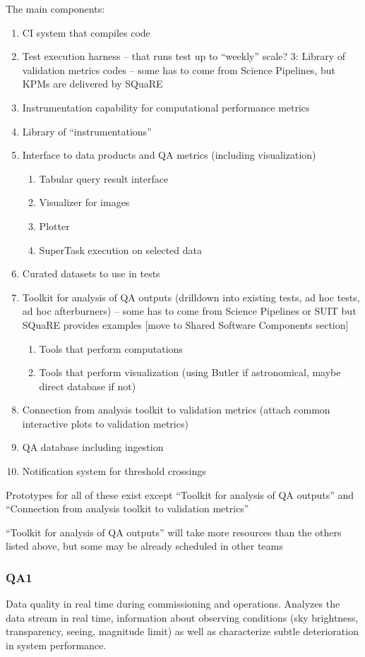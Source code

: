 The main components:
\begin{enumerate}
\item CI system that compiles code
\item Test execution harness – that runs test up to “weekly” scale? 3: Library of validation metrics codes – some has to come from Science Pipelines, but KPMs are delivered by SQuaRE
\item Instrumentation capability for computational performance metrics
\item Library of “instrumentations”
\item Interface to data products and QA metrics (including visualization)
    \begin{enumerate}
    \item Tabular query result interface
    \item Visualizer for images
    \item Plotter
    \item SuperTask execution on selected data
    \end{enumerate}
\item Curated datasets to use in tests
\item Toolkit for analysis of QA outputs (drilldown into existing tests, ad hoc tests, ad hoc afterburners) – some has to come from Science Pipelines or SUIT but SQuaRE provides examples [move to Shared Software Components section]
    \begin{enumerate}
    \item Tools that perform computations
    \item Tools that perform visualization (using Butler if astronomical, maybe direct database if not)
    \end{enumerate}
\item Connection from analysis toolkit to validation metrics (attach common interactive plots to validation metrics)
\item QA database including ingestion
\item Notification system for threshold crossings
\end{enumerate}

Prototypes for all of these exist except ``Toolkit for analysis of QA outputs'' and ``Connection from analysis toolkit to validation metrics''

``Toolkit for analysis of QA outputs'' will take more resources than the others listed above, but some may be already scheduled in other teams

\subsubsection{QA1}
Data quality in real time during commissioning and operations. Analyzes the data stream in real time, information about observing conditions (sky brightness, transparency, seeing, magnitude limit) as well as characterize subtle deterioration in system performance.

